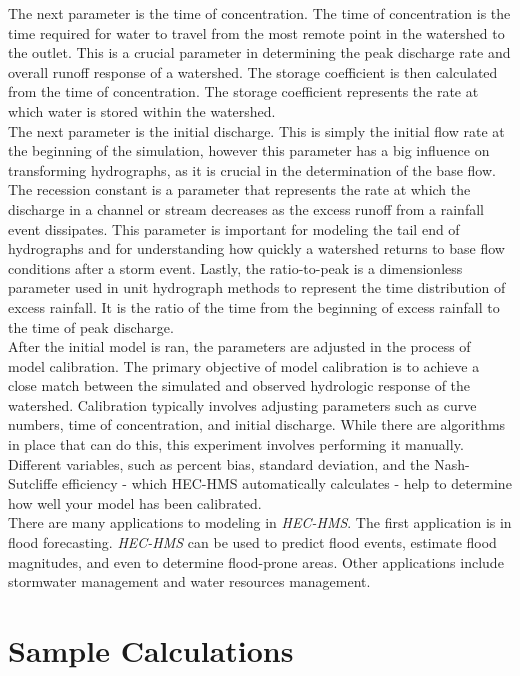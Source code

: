 \documentclass{article}
\begin{document}
\indent The next parameter is the time of concentration. The time of concentration is the time required for water to travel from the most remote point in the watershed to the outlet. This is a crucial parameter in determining the peak discharge rate and overall runoff response of a watershed. The storage coefficient is then calculated from the time of concentration. The storage coefficient represents the rate at which water is stored within the watershed. \\
\indent The next parameter is the initial discharge. This is simply the initial flow rate at the beginning of the simulation, however this parameter has a big influence on transforming hydrographs, as it is crucial in the determination of the base flow. The recession constant is a parameter that represents the rate at which the discharge in a channel or stream decreases as the excess runoff from a rainfall event dissipates. This parameter is important for modeling the tail end of hydrographs and for understanding how quickly a watershed returns to base flow conditions after a storm event. Lastly, the ratio-to-peak is a dimensionless parameter used in unit hydrograph methods to represent the time distribution of excess rainfall. It is the ratio of the time from the beginning of excess rainfall to the time of peak discharge.\\ 
\indent After the initial model is ran, the parameters are adjusted in the process of model calibration. The primary objective of model calibration is to achieve a close match between the simulated and observed hydrologic response of the watershed. Calibration typically involves adjusting parameters such as curve numbers, time of concentration, and initial discharge. While there are algorithms in place that can do this, this experiment involves performing it manually. Different variables, such as percent bias, standard deviation, and the Nash-Sutcliffe efficiency - which HEC-HMS automatically calculates - help to determine how well your model has been calibrated. \\ 
\indent There are many applications to modeling in \emph{HEC-HMS}. The first application is in flood forecasting. \emph{HEC-HMS} can be used to predict flood events, estimate flood magnitudes, and even to determine flood-prone areas. Other applications include stormwater management and water resources management.

\newpage
\section{Sample Calculations}
\end{document}

